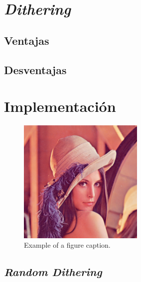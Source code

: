 \documentclass[conference]{IEEEtran}
\begin{document}
\section{\textit{Dithering}}
\textcolor{violet}{\lipsum[3]}

\subsection{Ventajas}
\textcolor{violet}{\lipsum[3]}

\subsection{Desventajas}
\textcolor{violet}{\lipsum[3]}


\section{Implementación}
\textcolor{violet}{\lipsum[3]}

\begin{figure}[htbp]
\centerline{\includegraphics[width=60mm]{code/lena}}
\caption{Example of a figure caption.}
\label{original}
\end{figure}

\subsection{\textit{Random Dithering}}
\textcolor{violet}{\lipsum[3]}

\end{document}
